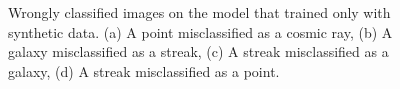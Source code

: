 \begin{figure}[!h]
    \caption[Wrongly classified images on the model that trained only with synthetic data.]{Wrongly classified images on the model that trained only with synthetic data. (a) A point misclassified as a cosmic ray, (b) A galaxy misclassified as a streak, (c) A streak misclassified as a galaxy, (d) A streak misclassified as a point. }
    \label{fig:wrongsyn}
\end{figure}


